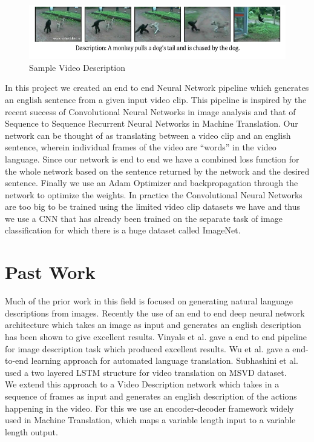 \documentclass[12pt]{article}
\begin{document}
		\begin{figure}[ht!]
		\centering
		\includegraphics[width=1.0\textwidth]{description.png}
		\caption{Sample Video Description\label{fig0}}
		\end{figure}		
In this project we created an end to end Neural Network pipeline which generates an english sentence from a given input video clip. This pipeline is inspired by the recent success of Convolutional Neural Networks\cite{cs231n} in image analysis and that of Sequence to Sequence Recurrent Neural Networks in Machine Translation\cite{gnmt}. Our network can be thought of as translating between a video clip and an english sentence, wherein individual frames of the video are ``words'' in the video language. Since our network is end to end we have a combined loss function for the whole network based on the sentence returned by the network and the desired sentence. Finally we use an Adam Optimizer and backpropagation through the network to optimize the weights. In practice the Convolutional Neural Networks are too big to be trained using the limited video clip datasets we have and thus we use a CNN that has already been trained on the separate task of image classification for which there is a huge dataset called ImageNet.

	\section{Past Work}

	Much of the prior work in this field is focused on generating natural language descriptions from images. Recently the use of an end to end deep neural network architecture which takes an image as input and generates an english description has  been shown to give excellent results. Vinyals et al.\cite{showandtell} gave a end to end pipeline for image description
	task which produced excellent results. Wu et al.\cite{gnmt} gave a end-to-end learning approach for automated language
	translation. Subhashini et al.\cite{s2vt} used a two layered LSTM\cite{ltms} structure for video translation on MSVD dataset.\\
	We extend this approach to a Video Description network which takes in a sequence of frames as input and generates an english description of the actions happening in the video. For this we use an encoder-decoder framework widely used in Machine Translation\cite{gnmt}, which maps a variable length input to a variable length output.
\end{document}

